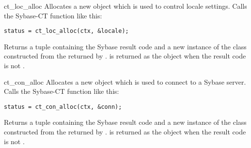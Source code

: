 \begin{methoddesc}[CS_CONTEXT]{ct_loc_alloc}{}
Allocates a new  object which is used to control
locale settings.  Calls the Sybase-CT 
function like this:

\begin{verbatim}
status = ct_loc_alloc(ctx, &locale);
\end{verbatim}

Returns a tuple containing the Sybase result code and a new instance
of the  class constructed from the 
returned by .   is returned as the
 object when the result code is not .
\end{methoddesc}

\begin{methoddesc}[CS_CONTEXT]{ct_con_alloc}{}
Allocates a new  object which is used to connect
to a Sybase server.  Calls the Sybase-CT 
function like this:

\begin{verbatim}
status = ct_con_alloc(ctx, &conn);
\end{verbatim}

Returns a tuple containing the Sybase result code and a new instance
of the  class constructed from the 
returned by .   is returned as the
 object when the result code is not
.
\end{methoddesc}


